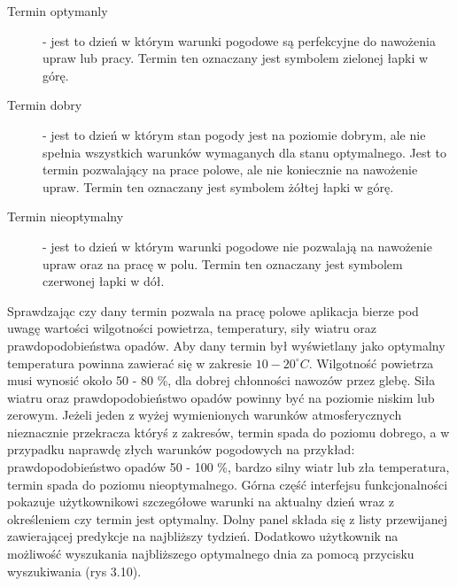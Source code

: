 \documentclass[a4paper,12pt,oneside]{book}
\begin{document}
		\begin{description}
			\item[Termin optymanly] - jest to dzień w którym warunki pogodowe są perfekcyjne do nawożenia upraw lub pracy. Termin ten oznaczany jest symbolem zielonej łapki w górę.
			\item[Termin dobry] - jest to dzień w którym stan pogody jest na poziomie dobrym, ale nie spełnia wszystkich warunków wymaganych dla stanu optymalnego. Jest to termin pozwalający na prace polowe, ale nie koniecznie na nawożenie upraw. Termin ten oznaczany jest symbolem żółtej łapki w górę.
			\item[Termin nieoptymalny] - jest to dzień w którym warunki pogodowe nie pozwalają na nawożenie upraw oraz na pracę w polu. Termin ten oznaczany jest symbolem czerwonej łapki w dół.
		\end{description}
	
		Sprawdzając czy dany termin pozwala na pracę polowe aplikacja bierze pod uwagę wartości wilgotności powietrza, temperatury, siły wiatru oraz prawdopodobieństwa opadów. Aby dany termin był wyświetlany jako optymalny temperatura powinna zawierać się w zakresie $10-20^{\circ} C$. Wilgotność powietrza musi wynosić około 50 - 80 \%, dla dobrej chłonności nawozów przez glebę. Siła wiatru oraz prawdopodobieństwo opadów powinny być na poziomie niskim lub zerowym. Jeżeli jeden z wyżej wymienionych warunków atmosferycznych nieznacznie przekracza któryś z zakresów, termin spada do poziomu dobrego, a w przypadku naprawdę złych warunków pogodowych na przykład: prawdopodobieństwo opadów 50 - 100 \%, bardzo silny wiatr lub zła temperatura, termin spada do poziomu nieoptymalnego. Górna część interfejsu funkcjonalności pokazuje użytkownikowi szczegółowe warunki na aktualny dzień wraz z określeniem czy termin jest optymalny. Dolny panel składa się z listy przewijanej zawierającej predykcje na najbliższy tydzień. Dodatkowo użytkownik na możliwość wyszukania najbliższego optymalnego dnia za pomocą przycisku wyszukiwania (rys 3.10).
		
\end{document}
